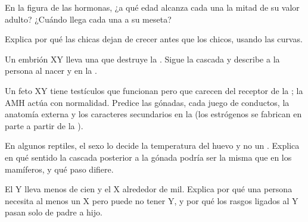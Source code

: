 \begin{exercise}[$\star\star$]\label{exo:g11:becoming-male-female:9}
En la figura de las hormonas, ¿a qué edad alcanza cada una la mitad de
su valor adulto? ¿Cuándo llega cada una a su meseta?
\end{exercise}

\begin{exercise}[$\star\star$]\label{exo:g11:becoming-male-female:10}
Explica por qué las chicas dejan de crecer antes que los chicos,
usando las curvas.
\end{exercise}

\begin{exercise}[$\star\star$]\label{exo:g11:becoming-male-female:11}
Un embrión XY lleva una  que destruye la  . Sigue la
cascada y describe a la persona al nacer y en la .
\end{exercise}

\begin{exercise}[$\star\star\star$]\label{exo:g11:becoming-male-female:12}
Un feto XY tiene testículos que funcionan pero  que carecen del
receptor de la ; la AMH actúa con normalidad. Predice las
gónadas, cada juego de conductos, la anatomía externa y los caracteres
secundarios en la  (los estrógenos se fabrican en parte a
partir de la ).
\end{exercise}

\begin{exercise}[$\star\star\star$]\label{exo:g11:becoming-male-female:13}
En algunos reptiles, el sexo lo decide la temperatura del huevo y no un
. Explica en qué sentido la cascada posterior a la gónada
podría ser la misma que en los mamíferos, y qué paso difiere.
\end{exercise}

\begin{exercise}[$\star\star\star$]\label{exo:g11:becoming-male-female:14}
El  Y lleva menos de cien  y el X alrededor de mil.
Explica por qué una persona necesita al menos un X pero puede no tener
Y, y por qué los rasgos ligados al Y pasan solo de padre a hijo.
\end{exercise}


